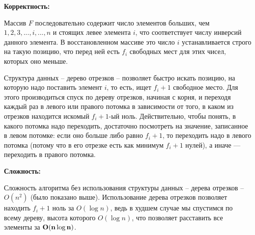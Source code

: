 \documentclass[12pt]{extreport}
\begin{document}
\bigskip 
{\bf Корректность:}

Массив $F$ последовательно содержит число элементов больших, чем $1, 2, 3, ...,i, ..., n$  и стоящих левее элемента $i$, что соответствует числу инверсий данного элемента. В восстановленном массиве это число $i$ устанавливается строго на такую позицию, что перед ней есть $f_i$ свободных мест для этих чисел, которых оно меньше. 

Структура данных -- дерево отрезков -- позволяет быстро искать позицию, на которую надо поставить элемент $i$, то есть, ищет $f_i +1$ свободное место. Для этого производиться спуск по дереву отрезков, начиная с корня, и переходя каждый раз в левого или правого потомка в зависимости от того, в каком из отрезков находится искомый $f_i +1 $-ый ноль. Действительно, чтобы понять, в какого потомка надо переходить, достаточно посмотреть на значение, записанное в левом потомке: если оно больше либо равно $f_i + 1$, то переходить надо в левого потомка (потому что в его отрезке есть как минимум  $f_i + 1$ нулей), а иначе — переходить в правого потомка.

\bigskip 
{\bf Сложность:} 

Сложность алгоритма без использования структуры данных -- дерева отрезков -- $O(n^2)$ (было показано выше). Использование дерева отрезков позволяет находить $f_i + 1$ ноль за $O(\log n)$, ведь в худшем случае мы спустимся по всему дереву, высота которого  $O(\log n)$, что позволяет расставить все элементы за $\bf{O(n \log n)}$.
 
\end{document}
